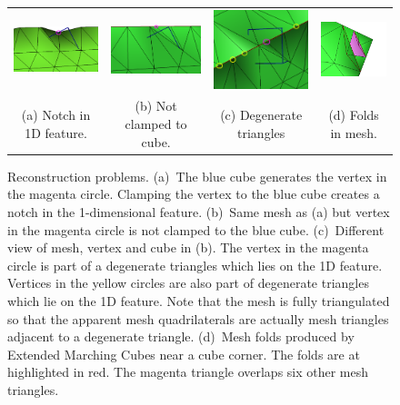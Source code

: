 
\begin{figure}
\centering
\begin{tabular}{cccc}
\includegraphics[width=1.2in]{images/cubeA_notch} \qquad &
\qquad
\includegraphics[width=1.2in]{images/cubeA_no_clamp.eps}
\qquad &
\qquad
\includegraphics[width=1.2in]{images/cubeA_degen.eps}
\qquad &
\qquad
\includegraphics[width=1.2in]{images/mesh_fold_EMC.eps} \\
(a) Notch in 1D feature. & (b) Not clamped to cube.
  & (c) Degenerate triangles & (d) Folds in mesh.\\
\end{tabular}
\caption{Reconstruction problems.
(a)~The blue cube generates the vertex in the magenta circle.
Clamping the vertex to the blue cube creates a notch 
in the 1-dimensional feature.
(b)~Same mesh as (a) but vertex in the magenta circle is not
clamped to the blue cube.
(c)~Different view of mesh, vertex and cube in (b).
The vertex in the magenta circle is part of a degenerate triangles
which lies on the 1D feature.
Vertices in the yellow circles are also part of degenerate triangles
which lie on the 1D feature.
Note that the mesh is fully triangulated so that the apparent
mesh quadrilaterals are actually mesh triangles adjacent 
to a degenerate triangle.
(d)~Mesh folds produced by Extended Marching Cubes near a cube corner.
The folds are at highlighted in red.
The magenta triangle overlaps six other mesh triangles.}
\label{fig:problems}
\end{figure}


